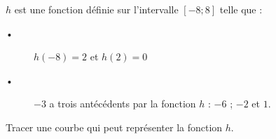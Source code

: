 
$h$ est une fonction définie sur l'intervalle $[-8 ; 8]$ telle que :
\begin{description}
\item[•] $h(-8)=2$ et $h(2)=0$
\item[•] $-3$ a trois antécédents par la fonction $h$ : $-6$ ; $-2$ et $1$.
\end{description}
Tracer une courbe qui peut représenter la fonction $h$.